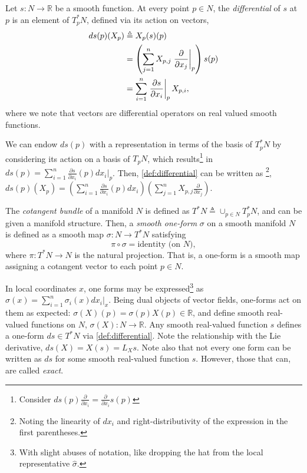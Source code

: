 \documentclass[psamsfonts]{amsart}
\theoremstyle{definition}
\theoremstyle{remark}
\newcommand*\R{\mathds{R}}
\newcommand*\isdefined{\triangleq}
\newcommand{\fracpartial}[2]{\frac{\partial #1}{\partial  #2}}
\numberwithin{equation}{section}
\begin{document}
 Let $s: N \rightarrow \R$ be a smooth function. At every point $p \in N$, the \textit{differential} of $s$ at $p$ is an element of $T^*_pN$, defined via its action on vectors, 
\begin{align}
    ds(p)(X_p) & \isdefined X_p(s)(p) \label{def:differential} \\%
     & = \left(\sum_{j = 1}^nX_{p, j}\left.\frac{\partial}{\partial x_j}\right\rvert_p\right)s(p) \notag \\
     & = \sum_{i = 1}^n \left.\frac{\partial s}{\partial x_i} \right\rvert_p X_{p, i}, \notag
\end{align}
where we note that vectors are differential operators on real valued smooth functions. 

We can endow $ds(p)$ with a representation in terms of the basis of $T^*_pN$ by considering its action on a basis of $T_pN$, which results\footnote{{\color{red}Consider $ds(p)\fracpartial{ }{x_i} = \fracpartial{}{x_i}s(p)$ }} in $ds(p) =\sum_{i = 1}^n \frac{\partial s}{\partial x_i}(p)dx_i\vert_p$. Then, \eqref{def:differential} can be written as \footnote{Noting the linearity of $dx_i$ and right-distributivity of the expression in the first parentheses.}, $ds(p)(X_p) = \left(\sum_{i = 1}^n \frac{\partial s}{\partial x_i}(p)dx_i  \right)\left(\sum_{j = 1}^nX_{p, j}\frac{\partial}{\partial x_j}\right)$. 

The \textit{cotangent bundle} of a manifold $N$ is defined as $T^*N \isdefined \cup_{p\in N}T_p^*N$, and can be given a manifold structure. Then, a \textit{smooth one-form} $\sigma$ on a smooth manifold $N$ is defined as a smooth map $\sigma : N \rightarrow T^*N$ satisfying $$\pi \circ \sigma = \text{identity (on } N),$$ where $\pi: T^*N \rightarrow N$ is the natural projection. That is, a one-form is a smooth map assigning a cotangent vector to each point $p\in N$.

In local coordinates $x$, one forms may be expressed\footnote{With slight abuses of notation, like dropping the hat from the local representative $\hat \sigma$.} as $\sigma(x) = \sum_{i=1}^n \sigma_i(x)dx_i\vert_{x}$. Being dual objects of vector fields, one-forms act on them as expected: $\sigma(X)(p) = \sigma(p)X(p) \in \R$, and define smooth real-valued functions on $N$, $\sigma(X) : N \rightarrow \R$. Any smooth real-valued function $s$ defines a one-form $ds\in T^*N$ via \eqref{def:differential}. Note the relationship with the Lie derivative, $ds(X) = X(s) = L_Xs$. Note also that not every one form can be written as $ds$ for some smooth real-valued function $s$. However, those that can, are called \textit{exact}. 
\end{document}
